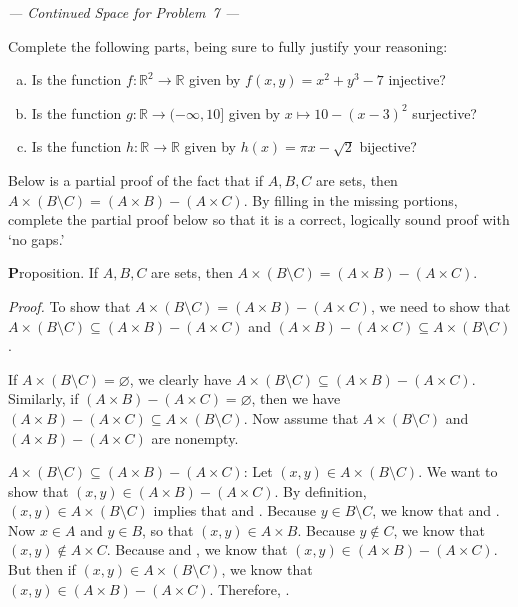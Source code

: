 \documentclass[12pt,letterpaper]{exam}
\newcommand{\blank}[1]{\underline{\hspace{#1}}} %
\begin{document}
\begin{questions}
\newpage 
\begin{center} {\itshape --- Continued Space for Problem~7 ---} \end{center}
\newpage

	

\newpage
\question[10] Complete the following parts, being sure to fully justify your reasoning:
	\begin{enumerate}[(a)]
	\item Is the function $f: \mathbb{R}^2 \to \mathbb{R}$ given by $f(x, y)= x^2 + y^3 - 7$ injective?
	\item Is the function $g: \mathbb{R} \to (-\infty, 10]$ given by $x \mapsto 10 - (x - 3)^2$ surjective?
	\item Is the function $h: \mathbb{R} \to \mathbb{R}$ given by $h(x)= \pi x - \sqrt{2}$ bijective? 
	\end{enumerate}



\newpage
\question[10] Below is a partial proof of the fact that if $A, B, C$ are sets, then $A \times (B \setminus C)= (A \times B) - (A \times C)$. By filling in the missing portions, complete the partial proof below so that it is a correct, logically sound proof with `no gaps.' \pspace

{\textbf Proposition.} If $A, B, C$ are sets, then $A \times (B \setminus C)= (A \times B) - (A \times C)$. \pspace

{\itshape Proof.} To show that $A \times (B \setminus C)= (A \times B) - (A \times C)$, we need to show that $A \times (B \setminus C) \subseteq (A \times B) - (A \times C)$ and $(A \times B) - (A \times C) \subseteq A \times (B \setminus C)$. \par\vspace{2\baselineskip}

If $A \times (B \setminus C)= \varnothing$, we clearly have $A \times (B \setminus C) \subseteq (A \times B) - (A \times C)$. Similarly, if $(A \times B) - (A \times C)= \varnothing$, then we have $(A \times B) - (A \times C) \subseteq A \times (B \setminus C)$. Now assume that $A \times (B \setminus C)$ and $(A \times B) - (A \times C)$ are nonempty. \par\vspace{2\baselineskip}

$A \times (B \setminus C) \subseteq (A \times B) - (A \times C)$: Let $(x, y) \in A \times (B \setminus C)$. We want to show that \pspace $(x, y) \in (A \times B) - (A \times C)$. By definition, $(x, y) \in A \times (B \setminus C)$ implies that \blank{3cm} \pspace and \blank{3cm}. Because $y \in B \setminus C$, we know that \blank{4cm} and \pspace \blank{4cm}. Now $x \in A$ and $y \in B$, so that $(x, y) \in A \times B$. Because $y \notin C$, \pspace we know that $(x, y) \notin A \times C$. Because \blank{4cm} and \blank{4cm}, \pspace we know that $(x, y) \in (A \times B) - (A \times C)$. But then if $(x, y) \in A \times (B \setminus C)$, we know \pspace that $(x, y) \in (A \times B) - (A \times C)$. Therefore, \blank{6cm}. \par\vspace{2\baselineskip}


\end{questions}
\end{document}
